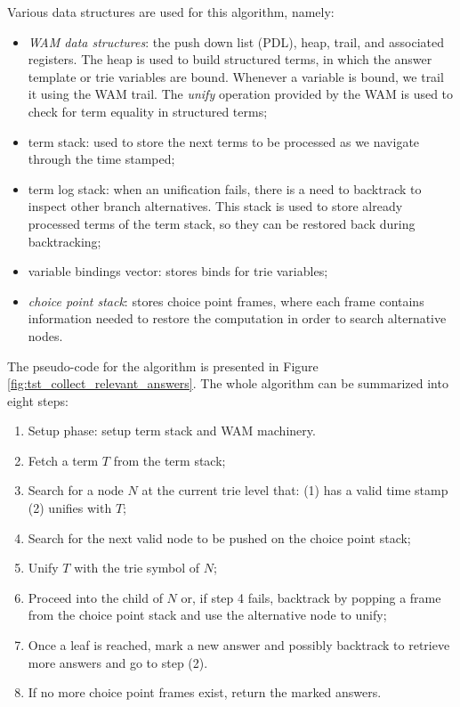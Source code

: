 Various data structures are used for this algorithm, namely:

\begin{itemize}
  \item \textit{WAM data structures}: the push down list (PDL),
  heap, trail, and associated registers. The heap is used to build structured terms, in which the
  answer template or trie variables are bound. Whenever a variable is bound, we trail it using the WAM trail. The \textit{unify} operation provided by the WAM is used to check for term equality in structured terms;
  
  \item term stack: used to store the next terms to be processed as we navigate through the time stamped;
  
  \item term log stack: when an unification fails, there is a need to backtrack to inspect other branch alternatives.
  This stack is used to store already processed terms of the term stack, so they can be restored back during backtracking;
  
  \item variable bindings vector: stores binds for trie variables;
  
  \item \textit{choice point stack}: stores choice point frames, where each frame contains
  information needed to restore the computation in order to search alternative nodes.
\end{itemize}

The pseudo-code for the algorithm is presented in Figure \ref{fig:tst_collect_relevant_answers}.
The whole algorithm can be summarized into eight steps:

\begin{enumerate}
  \item Setup phase: setup term stack and WAM machinery.
  \item Fetch a term $T$ from the term stack;
  \item Search for a node $N$ at the current trie level that: (1) has a valid time stamp (2) unifies with $T$;
  \item Search for the next valid node to be pushed on the choice point stack;
  \item Unify $T$ with the trie symbol of $N$;
  \item Proceed into the child of $N$ or, if step 4 fails, backtrack by popping a frame from the choice point stack and use the alternative node to unify;
  \item Once a leaf is reached, mark a new answer and possibly backtrack to retrieve more answers and go to step (2).
  \item If no more choice point frames exist, return the marked answers.
\end{enumerate}

